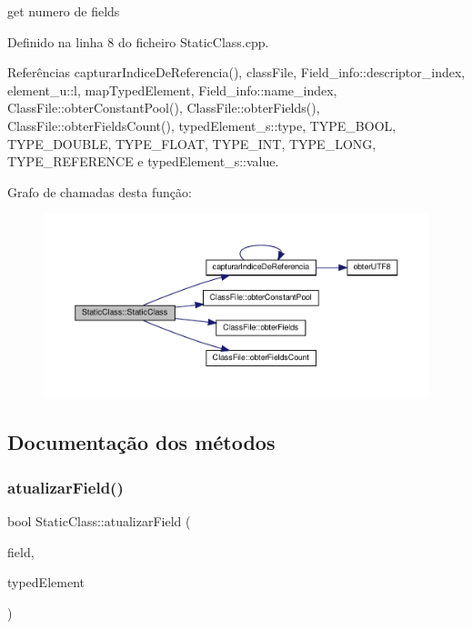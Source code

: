 get numero de fields 

Definido na linha 8 do ficheiro Static\+Class.\+cpp.



Referências capturar\+Indice\+De\+Referencia(), class\+File, Field\+\_\+info\+::descriptor\+\_\+index, element\+\_\+u\+::l, map\+Typed\+Element, Field\+\_\+info\+::name\+\_\+index, Class\+File\+::obter\+Constant\+Pool(), Class\+File\+::obter\+Fields(), Class\+File\+::obter\+Fields\+Count(), typed\+Element\+\_\+s\+::type, T\+Y\+P\+E\+\_\+\+B\+O\+OL, T\+Y\+P\+E\+\_\+\+D\+O\+U\+B\+LE, T\+Y\+P\+E\+\_\+\+F\+L\+O\+AT, T\+Y\+P\+E\+\_\+\+I\+NT, T\+Y\+P\+E\+\_\+\+L\+O\+NG, T\+Y\+P\+E\+\_\+\+R\+E\+F\+E\+R\+E\+N\+CE e typed\+Element\+\_\+s\+::value.

Grafo de chamadas desta função\+:\nopagebreak
\begin{figure}[H]
\begin{center}
\leavevmode
\includegraphics[width=350pt]{classStaticClass_a6c0e4d8842888a97160f1e815c8e6ac3_cgraph}
\end{center}
\end{figure}


\subsection{Documentação dos métodos}
\mbox{\label{classStaticClass_aa0d9a3db46155bf6971476a22c4f2eaa}} 
\subsubsection{\texorpdfstring{atualizar\+Field()}{atualizarField()}}
{\footnotesize\ttfamily bool Static\+Class\+::atualizar\+Field (\begin{DoxyParamCaption}\item[{string}]{field,  }\item[{\hyperlink{BasicTypes_8h_a97b332303b1262282599e6ede0637b82}{Typed\+Element}}]{typed\+Element }\end{DoxyParamCaption})}




